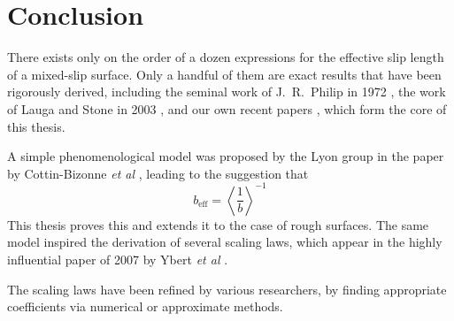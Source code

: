 \documentclass[a4paper]{report}
\newcommand{\beff}{\ensuremath{b_{\mathrm{eff}}}}
\begin{document}
\section*{Conclusion}

There exists only on the order of a dozen expressions for the effective slip length of a mixed-slip surface.  Only a handful of them are exact results that have been rigorously derived, including the seminal work of J.\ R.\ Philip in 1972 \cite{Philip1972}, the work of Lauga and Stone in 2003 \cite{LaugaStone2003}, and our own recent papers \cite{HendyLund2007,LundHendy2008,Lund2012}, which form the core of this thesis.

A simple phenomenological model was proposed by the Lyon group in the paper by Cottin-Bizonne \emph{et al} \cite{Cottin-Bizonne2004}, leading to the suggestion that
\begin{equation*}
\beff = \left<  \frac{1}{b} \right>^{-1}
\end{equation*}
This thesis proves this and extends it to the case of rough surfaces.  The same model inspired the derivation of several scaling laws, which appear in the highly influential paper of 2007 by Ybert \emph{et al} \cite{Ybert2007}.

The scaling laws have been refined by various researchers, by finding appropriate coefficients via numerical or approximate methods.

\begin{center} \vspace{3em} \Coffeecup \end{center}



\end{document}
